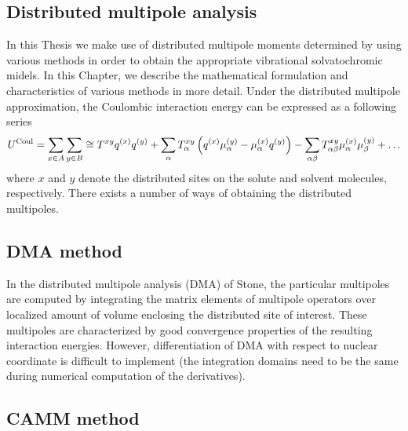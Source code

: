\documentclass[a4paper,titlepage,twoside,fleqn,12pt]{book}
\begin{document}
\begin{appendices}
\begin{refsection}
\chapter{Distributed multipole analysis\label{c:dma}}

In this Thesis we make use of distributed multipole 
moments determined by using various methods in order to obtain
the appropriate vibrational solvatochromic midels. In this Chapter,
we describe the mathematical formulation and characteristics of various methods
in more detail.
Under the distributed multipole approximation, the Coulombic
interaction energy can be expressed as a following series\citep{Stone.TheTheoryOfIntermolecularForces.1996}
%
\begin{equation}
 U^{\rm Coul} = \sum_{x\in A}\sum_{y\in B} \cong T^{xy}q^{(x)}q^{(y)} + 
\sum_\alpha T^{xy}_\alpha \left( q^{(x)} \mu^{(y)}_\alpha - \mu^{(x)}_\alpha q^{(y)}\right)
 - \sum_{\alpha\beta} T^{xy}_{\alpha\beta} \mu^{(x)}_\alpha \mu^{(y)}_\beta + \ldots
\end{equation}
%
where $x$ and $y$ denote the distributed sites on the solute and solvent
molecules, respectively. There exists a number of ways of obtaining
the distributed multipoles. 

\section{DMA method}

In the distributed multipole analysis 
(DMA) of Stone\citep{Stone.JCTC.2005}, the particular multipoles
are computed by integrating the matrix elements of multipole
operators over localized amount of volume enclosing the distributed
site of interest. These multipoles are characterized by good convergence
properties of the resulting interaction energies. 
However, differentiation of DMA with respect to nuclear coordinate
is difficult to implement (the integration domains need to be the same
during numerical computation of the derivatives). 

\section{CAMM method}


\end{refsection}
\end{appendices}
\end{document}
